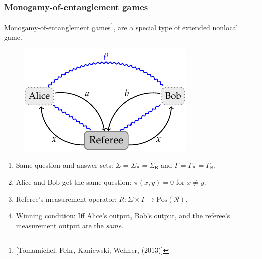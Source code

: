 \documentclass{beamer}
\def\R{\mathcal{R}}
\def \GammaA{\Gamma_{\reg{A}}}
\def \GammaB{\Gamma_{\reg{B}}}
\def \SigmaA{\Sigma_{\reg{A}}}
\def \SigmaB{\Sigma_{\reg{B}}}
\newcommand{\setft}[1]{\mathrm{#1}}
\newcommand{\Pos}{\setft{Pos}}
\newcommand{\reg}[1]{\mathsf{#1}}
\begin{document}
\begin{frame}
	\frametitle{Monogamy-of-entanglement games}
	Monogamy-of-entanglement games\footnote{[Tomamichel, Fehr, Kaniewski, Wehner, (2013)]}, are a special type of extended nonlocal game. 
\begin{figure}[!htpb] \label{fig:monogamy-of-entanglement game}
	\begin{center}
		\includegraphics[scale=1.0]{figures/monogamy_game.pdf}
	\end{center}
\end{figure}
	\begin{enumerate}
		\item Same question and answer sets: $\Sigma = \SigmaA = \SigmaB$ and $\Gamma = \GammaA = \GammaB$. 
		\item Alice and Bob get the same question: $\pi(x,y) = 0$ for $x \not= y$. 
		\item Referee's measurement operator: $R : \Sigma \times \Gamma \rightarrow \Pos(\R)$. 
		\item Winning condition: Iff Alice's output, Bob's output, and the referee's measurement output are the \emph{same}. 
	\end{enumerate}
\end{frame}
\end{document}
